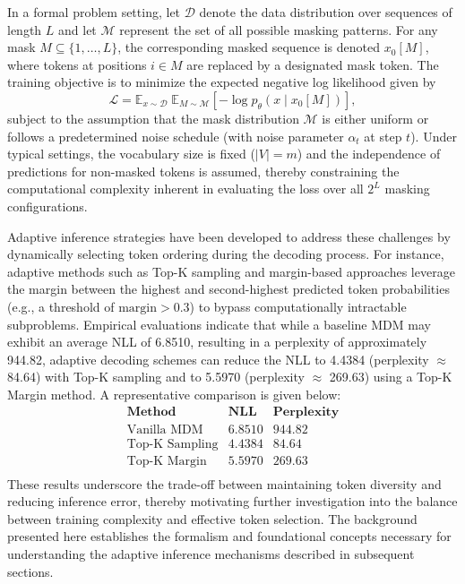 \documentclass{article}
\begin{document}
In a formal problem setting, let \(\mathcal{D}\) denote the data distribution over sequences of length \(L\) and let \(\mathcal{M}\) represent the set of all possible masking patterns. For any mask \(M \subseteq \{1, \dots, L\}\), the corresponding masked sequence is denoted \(x_0[M]\), where tokens at positions \(i \in M\) are replaced by a designated mask token. The training objective is to minimize the expected negative log likelihood given by
\[
\mathcal{L} = \mathbb{E}_{x \sim \mathcal{D}} \; \mathbb{E}_{M \sim \mathcal{M}} \left[-\log p_\theta(x \mid x_0[M])\right],
\]
subject to the assumption that the mask distribution \(\mathcal{M}\) is either uniform or follows a predetermined noise schedule (with noise parameter \(\alpha_t\) at step \(t\)). Under typical settings, the vocabulary size is fixed (\(|V| = m\)) and the independence of predictions for non-masked tokens is assumed, thereby constraining the computational complexity inherent in evaluating the loss over all \(2^L\) masking configurations.

Adaptive inference strategies have been developed to address these challenges by dynamically selecting token ordering during the decoding process. For instance, adaptive methods such as Top-K sampling and margin-based approaches leverage the margin between the highest and second-highest predicted token probabilities (e.g., a threshold of \(\text{margin} > 0.3\)) to bypass computationally intractable subproblems. Empirical evaluations indicate that while a baseline MDM may exhibit an average NLL of 6.8510, resulting in a perplexity of approximately 944.82, adaptive decoding schemes can reduce the NLL to 4.4384 (perplexity \(\approx\) 84.64) with Top-K sampling and to 5.5970 (perplexity \(\approx\) 269.63) using a Top-K Margin method. A representative comparison is given below:
\[
\begin{array}{l|cc}
\textbf{Method} & \textbf{NLL} & \textbf{Perplexity} \\
\hline
\text{Vanilla MDM} & 6.8510 & 944.82 \\
\text{Top-K Sampling} & 4.4384 & 84.64 \\
\text{Top-K Margin} & 5.5970 & 269.63 \\
\end{array}
\]
These results underscore the trade-off between maintaining token diversity and reducing inference error, thereby motivating further investigation into the balance between training complexity and effective token selection. The background presented here establishes the formalism and foundational concepts necessary for understanding the adaptive inference mechanisms described in subsequent sections.
\end{document}

